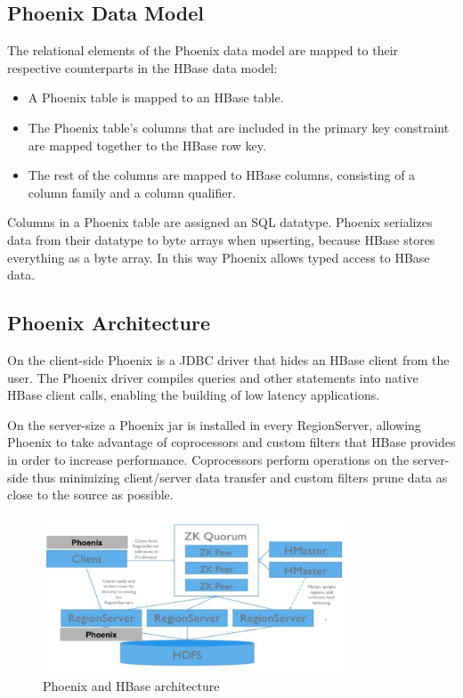 \subsection{Phoenix Data Model}

The relational elements of the Phoenix data model are mapped to their respective counterparts in the HBase data model:

\begin{itemize}
\item A Phoenix table is mapped to an HBase table.
\item The Phoenix table's columns that are included in the primary key constraint are mapped together to the HBase row key.
\item The rest of the columns are mapped to HBase columns, consisting of a column family and a column qualifier.
\end{itemize}

Columns in a Phoenix table are assigned an SQL datatype. Phoenix serializes data from their datatype to byte arrays when upserting, because HBase stores everything as a byte array. In this way Phoenix allows typed access to HBase data.

\subsection{Phoenix Architecture}

On the client-side Phoenix is a JDBC driver that hides an HBase client from the user. The Phoenix driver compiles queries and other statements into native HBase client calls, enabling the building of low latency applications.

On the server-size a Phoenix jar is installed in every RegionServer, allowing Phoenix to take advantage of coprocessors and custom filters that HBase provides in order to increase performance. Coprocessors perform operations on the server-side thus minimizing client/server data transfer and custom filters prune data as close to the source as possible.

\begin{figure}[H]
\centering
\includegraphics[width=0.8\textwidth]{figures/phoenix_architecture}
\caption{Phoenix and HBase architecture}
\label{figure:phoenix_architecture}
\end{figure}

